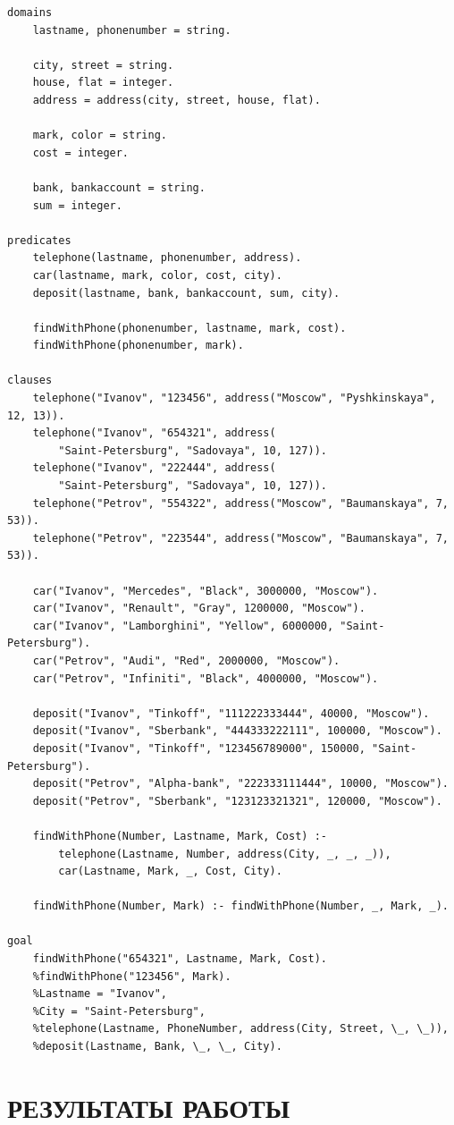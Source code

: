 \begin{lstlisting}[caption=Текст программы]
domains
	lastname, phonenumber = string.

	city, street = string.
	house, flat = integer.
	address = address(city, street, house, flat).

	mark, color = string.
	cost = integer.

	bank, bankaccount = string.
	sum = integer.

predicates
	telephone(lastname, phonenumber, address).
	car(lastname, mark, color, cost, city).
	deposit(lastname, bank, bankaccount, sum, city).

	findWithPhone(phonenumber, lastname, mark, cost).
	findWithPhone(phonenumber, mark).

clauses
	telephone("Ivanov", "123456", address("Moscow", "Pyshkinskaya", 12, 13)).
	telephone("Ivanov", "654321", address(
		"Saint-Petersburg", "Sadovaya", 10, 127)).
	telephone("Ivanov", "222444", address(
		"Saint-Petersburg", "Sadovaya", 10, 127)).
	telephone("Petrov", "554322", address("Moscow", "Baumanskaya", 7, 53)).
	telephone("Petrov", "223544", address("Moscow", "Baumanskaya", 7, 53)).

	car("Ivanov", "Mercedes", "Black", 3000000, "Moscow").
	car("Ivanov", "Renault", "Gray", 1200000, "Moscow").
	car("Ivanov", "Lamborghini", "Yellow", 6000000, "Saint-Petersburg").
	car("Petrov", "Audi", "Red", 2000000, "Moscow").
	car("Petrov", "Infiniti", "Black", 4000000, "Moscow").

	deposit("Ivanov", "Tinkoff", "111222333444", 40000, "Moscow").
	deposit("Ivanov", "Sberbank", "444333222111", 100000, "Moscow").
	deposit("Ivanov", "Tinkoff", "123456789000", 150000, "Saint-Petersburg").
	deposit("Petrov", "Alpha-bank", "222333111444", 10000, "Moscow").
	deposit("Petrov", "Sberbank", "123123321321", 120000, "Moscow").

	findWithPhone(Number, Lastname, Mark, Cost) :-
		telephone(Lastname, Number, address(City, _, _, _)),
		car(Lastname, Mark, _, Cost, City).

	findWithPhone(Number, Mark) :- findWithPhone(Number, _, Mark, _).

goal
	findWithPhone("654321", Lastname, Mark, Cost).
	%findWithPhone("123456", Mark).
	%Lastname = "Ivanov",
	%City = "Saint-Petersburg",
	%telephone(Lastname, PhoneNumber, address(City, Street, \_, \_)),
	%deposit(Lastname, Bank, \_, \_, City).
\end{lstlisting}

\section{РЕЗУЛЬТАТЫ РАБОТЫ}

